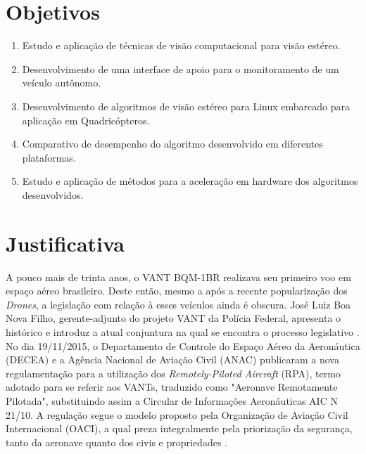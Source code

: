 \section{Objetivos}

\begin{enumerate}
	\item Estudo e aplicação de técnicas de visão computacional para visão estéreo.
	\item Desenvolvimento de uma interface de apoio para o monitoramento de um veículo autônomo.
	\item Desenvolvimento de algoritmos de visão estéreo para Linux embarcado para aplicação em Quadricópteros.
	\item Comparativo de desempenho do algoritmo desenvolvido em diferentes plataformas.
	\item Estudo e aplicação de métodos para a aceleração em hardware dos algoritmos desenvolvidos.
\end{enumerate}


\section{Justificativa}

A pouco mais de trinta anos, o VANT BQM-1BR realizava seu primeiro voo em espaço aéreo brasileiro. Deste então, mesmo a após a recente popularização dos \textit{Drones}, a legislação com relação à esses veículos ainda é obscura. José Luiz Boa Nova Filho, gerente-adjunto do projeto VANT da Polícia Federal, apresenta o histórico e introduz a atual conjuntura na qual se encontra o processo legislativo \cite{Filho2014}. No dia 19/11/2015, o Departamento de Controle do Espaço Aéreo da Aeronáutica (DECEA) e a Agência Nacional de Aviação Civil (ANAC) publicaram a nova regulamentação para a utilização dos \textit{Remotely-Piloted Aircraft} (RPA), termo adotado para se referir aos VANTs, traduzido como "Aeronave Remotamente Pilotada", substituindo assim a Circular de Informações Aeronáuticas AIC N 21/10. A regulação segue o modelo proposto pela Organização de Aviação Civil Internacional (OACI), a qual preza integralmente pela priorização da segurança, tanto da aeronave quanto dos civis e propriedades \cite{DECEA2015}. 

